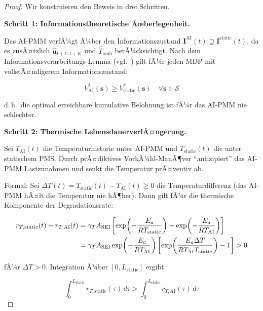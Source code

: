 ﻿\documentclass[12pt,a4paper]{article}
\begin{document}
	\begin{proof}
		Wir konstruieren den Beweis in drei Schritten.
		
		\textbf{Schritt 1: Informationstheoretische Ãœberlegenheit.}
		
		Das AI-PMM verfÃ¼gt Ã¼ber den Informationszustand
		$\mathbf{I}^\mathrm{AI}(t) \supseteq \mathbf{I}^\mathrm{static}(t)$,
		da es zusÃ¤tzlich $\hat{\mathbf{u}}_{t+1:t+K}$ und $\hat{T}_\mathrm{amb}$
		berÃ¼cksichtigt. Nach dem Informationsverarbeitungs-Lemma
		(vgl.\ \cite{Bertsekas2005}) gilt fÃ¼r jeden MDP mit vollstÃ¤ndigerem
		Informationszustand:
		
		\begin{equation}
			V^*_\mathrm{AI}(\mathbf{s}) \geq V^*_\mathrm{static}(\mathbf{s})
			\quad \forall \mathbf{s} \in \mathcal{S}
		\end{equation}
		
		d.\,h.\ die optimal erreichbare kumulative Belohnung ist fÃ¼r das AI-PMM
		nie schlechter.
		
		\textbf{Schritt 2: Thermische LebensdauerverlÃ¤ngerung.}
		
		Sei $T_\mathrm{AI}(t)$ die Temperaturhistorie unter AI-PMM und
		$T_\mathrm{static}(t)$ die unter statischem PMS. Durch prÃ¤diktives
		VorkÃ¼hl-ManÃ¶ver ``antizipiert'' das AI-PMM Lastzunahmen und senkt
		die Temperatur prÃ¤ventiv ab.
		
		Formal: Sei $\Delta T(t) = T_\mathrm{static}(t) - T_\mathrm{AI}(t) \geq 0$
		die Temperaturdifferenz (das AI-PMM hÃ¤lt die Temperatur nie hÃ¶her). Dann gilt
		fÃ¼r die thermische Komponente der Degradationsrate:
		
		\begin{align}
			r_{T,\mathrm{static}}(t) - r_{T,\mathrm{AI}}(t)
			&= \gamma_T A_\mathrm{SEI}\left[\exp\!\left(-\frac{E_a}{RT_\mathrm{static}}\right)
			- \exp\!\left(-\frac{E_a}{RT_\mathrm{AI}}\right)\right] \notag\\
			&= \gamma_T A_\mathrm{SEI} \exp\!\left(-\frac{E_a}{RT_\mathrm{AI}}\right)
			\left[\exp\!\left(\frac{E_a \Delta T}{R T_\mathrm{AI} T_\mathrm{static}}\right) - 1\right]
			> 0
			\label{eq:temp_proof}
		\end{align}
		
		fÃ¼r $\Delta T > 0$. Integration Ã¼ber $[0, L_\mathrm{static}]$ ergibt:
		
		\begin{equation}
			\int_0^{L_\mathrm{static}} r_{T,\mathrm{static}}(\tau)\,d\tau >
			\int_0^{L_\mathrm{static}} r_{T,\mathrm{AI}}(\tau)\,d\tau
			\label{eq:temp_integral_ineq}
		\end{equation}
		

\end{proof}
\end{document}
